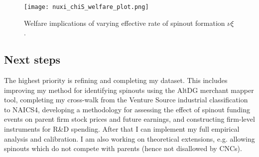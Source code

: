 \documentclass[11pt,english]{article}
\theoremstyle{remark}
\begin{document}
\begin{figure}[h] 
	\centering
	\texttt{[image: nuxi\_chiS\_welfare\_plot.png]}
	\caption{Welfare implications of varying effective rate of spinout formation $\nu \xi$.}
	\label{welfare_plots}
\end{figure}


\subsection*{Next steps}

The highest priority is refining and completing my dataset. This includes improving my method for identifying spinouts using the AltDG merchant mapper tool, completing my cross-walk from the Venture Source industrial classification to NAICS4, developing a methodology for assessing the effect of spinout funding events on parent firm stock prices and future earnings, and constructing firm-level instruments for R\&D spending. After that I can implement my full empirical analysis and calibration. I am also working on theoretical extensions, e.g. allowing spinouts which do not compete with parents (hence not disallowed by CNCs). 

\footnotesize


\end{document}
